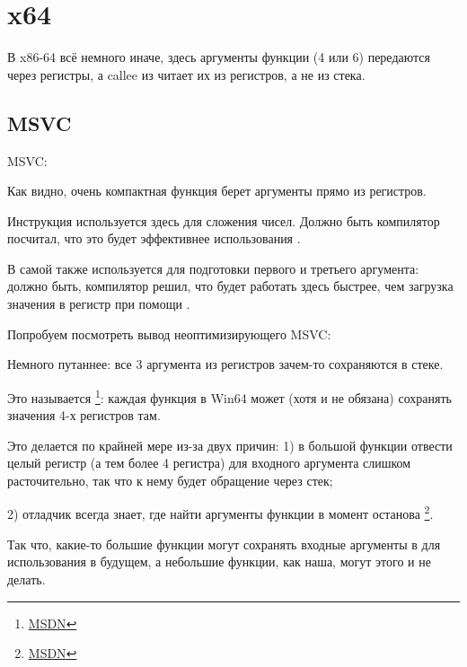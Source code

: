 \section{x64}

В x86-64 всё немного иначе, здесь аргументы функции (4 или 6) передаются через регистры, 
а \gls{callee} из читает их из регистров, а не из стека.

\subsection{MSVC}

\Optimizing MSVC:



Как видно, очень компактная функция \ttf берет аргументы прямо из регистров.

Инструкция \LEA используется здесь для сложения чисел. 
Должно быть компилятор посчитал, что это будет эффективнее использования .

В самой \main{} \LEA{} также используется для подготовки первого и третьего аргумента: должно быть,
компилятор решил, что \LEA{} будет работать здесь быстрее, чем загрузка значения в регистр при помощи \MOV.

Попробуем посмотреть вывод неоптимизирующего MSVC:



Немного путаннее: все 3 аргумента из регистров зачем-то сохраняются в стеке.

\label{shadow_space}
Это называется  \footnote{\href{http://go.yurichev.com/17256}{MSDN}}: 
каждая функция в Win64 может (хотя и не обязана) сохранять значения 4-х регистров там.

Это делается по крайней мере из-за двух причин: 
1) в большой функции отвести целый регистр (а тем более 4 регистра) для входного аргумента 
слишком расточительно, так что к нему будет обращение через стек;

2) отладчик всегда знает, где найти аргументы функции в момент останова
\footnote{\href{http://go.yurichev.com/17257}{MSDN}}.

Так что, какие-то большие функции могут сохранять входные аргументы в  
для использования в будущем, а небольшие функции, как наша, могут этого и не делать.

